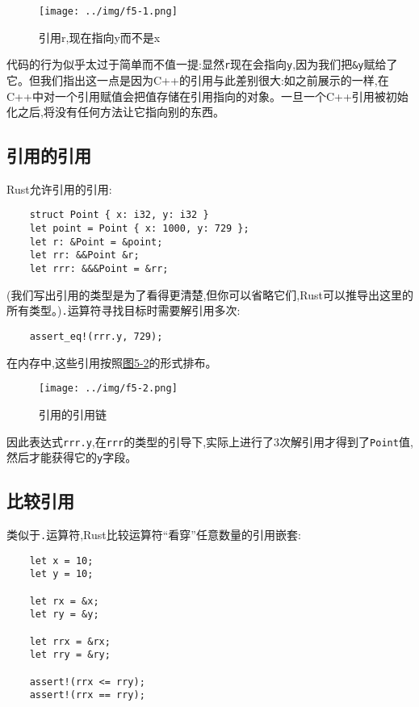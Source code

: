 \begin{figure}[htbp]
    \centering
    \texttt{[image: ../img/f5-1.png]}
    \caption{引用r,现在指向y而不是x}
    \label{f5-1}
\end{figure}

代码的行为似乎太过于简单而不值一提:显然\texttt{r}现在会指向\texttt{y},因为我们把\texttt{\&y}赋给了它。但我们指出这一点是因为C++的引用与此差别很大:如之前展示的一样,在C++中对一个引用赋值会把值存储在引用指向的对象。一旦一个C++引用被初始化之后,将没有任何方法让它指向别的东西。

\subsection{引用的引用}
Rust允许引用的引用:
\begin{verbatim}
    struct Point { x: i32, y: i32 }
    let point = Point { x: 1000, y: 729 };
    let r: &Point = &point;
    let rr: &&Point &r;
    let rrr: &&&Point = &rr;
\end{verbatim}

(我们写出引用的类型是为了看得更清楚,但你可以省略它们,Rust可以推导出这里的所有类型。)\texttt{.}运算符寻找目标时需要解引用多次:
\begin{verbatim}
    assert_eq!(rrr.y, 729);
\end{verbatim}

在内存中,这些引用按照\hyperref[f5-2]{图5-2}的形式排布。

\begin{figure}[htbp]
    \centering
    \texttt{[image: ../img/f5-2.png]}
    \caption{引用的引用链}
    \label{f5-2}
\end{figure}

因此表达式\texttt{rrr.y},在\texttt{rrr}的类型的引导下,实际上进行了3次解引用才得到了\texttt{Point}值,然后才能获得它的\texttt{y}字段。

\subsection{比较引用}

类似于\texttt{.}运算符,Rust比较运算符“看穿”任意数量的引用嵌套:
\begin{verbatim}
    let x = 10;
    let y = 10;

    let rx = &x;
    let ry = &y;

    let rrx = &rx;
    let rry = &ry;

    assert!(rrx <= rry);
    assert!(rrx == rry);
\end{verbatim}

